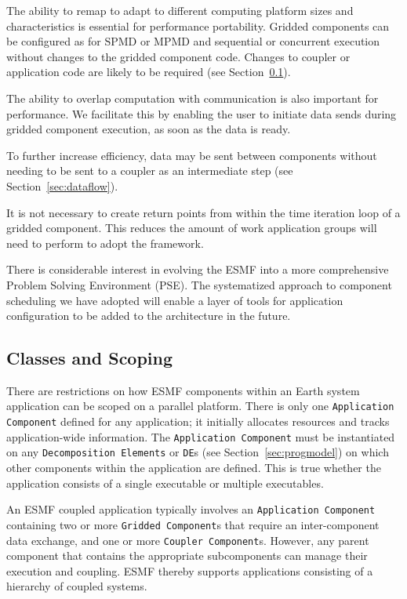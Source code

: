The ability to remap to adapt to different computing platform sizes 
and characteristics is essential for performance portability.
Gridded components can be configured as for SPMD or MPMD and 
sequential or concurrent execution without changes to the gridded 
component code.  Changes to coupler or application code are likely to 
be required (see Section~\ref{sec:scoping}).

The ability to overlap computation with communication is also important for
performance.  We facilitate this by enabling the user to initiate data 
sends during gridded component execution, as soon as the data is ready.

To further increase efficiency, data may be sent between components without 
needing to be sent to a coupler as an intermediate step (see
Section~\ref{sec:dataflow}).

It is not necessary to create return points from 
within the time iteration loop of a gridded component.  This reduces the
amount of work application groups will need to perform to adopt the 
framework.

There is considerable interest in evolving the ESMF into a more comprehensive
Problem Solving Environment (PSE).  The systematized approach to component 
scheduling we have adopted will enable a layer of tools for application 
configuration to be added to the architecture in the future.

\subsection{Classes and Scoping}
\label{sec:scoping}
There are restrictions on how ESMF components within an Earth system application 
can be scoped on a parallel platform.  There is only one {\tt Application Component} 
defined for any application; it initially allocates resources and tracks 
application-wide information. 
The {\tt Application Component} must be instantiated on 
any {\tt Decomposition Elements} or {\tt DE}s (see Section~\ref{sec:progmodel}) on 
which other components
within the application are defined.  This is true whether the 
application consists of a single executable or multiple 
executables.  

An ESMF coupled application typically involves an {\tt Application Component} 
containing two or more {\tt Gridded Component}s that require an 
inter-component data exchange, and one or more {\tt Coupler 
Component}s.  However, any parent component that contains the appropriate 
subcomponents can manage their execution and coupling.  ESMF thereby
supports applications consisting of a hierarchy of coupled systems.

